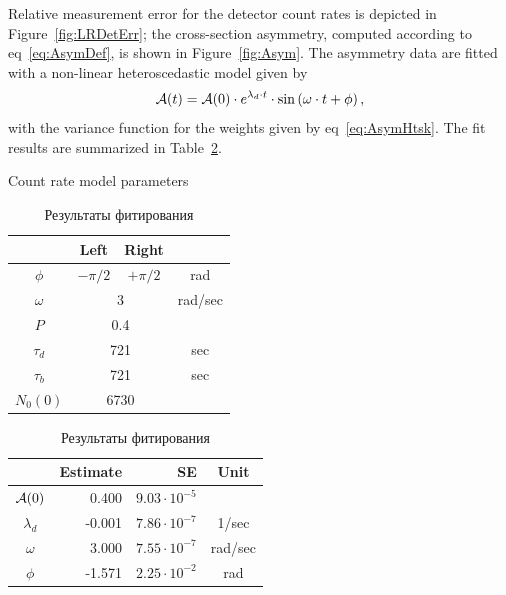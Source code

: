 \documentclass{article}
\newcommand{\vp}[2]{{#1}\cdot 10^{#2}}
\newcommand{\LTb}{\tau_b}
\newcommand{\LTd}{\tau_d}
\newcommand{\lamd}{\lambda_d}
\begin{document}
Relative measurement error for the detector count rates is depicted in Figure~\ref{fig:LRDetErr}; the cross-section asymmetry, computed according to eq~\eqref{eq:AsymDef}, is shown in Figure~\ref{fig:Asym}.
The asymmetry data are fitted with a non-linear heteroscedastic model given by
\[
\Asym(t) = \Asym(0)\cdot e^{\lamd\cdot t}\cdot\sin\bkt{\omega\cdot t + \phi},
\]
with the variance function for the weights given by eq~\eqref{eq:AsymHtsk}. The fit results are summarized in Table~\ref{tbl:FitRes}.
\begin{table}[h]
  \begin{minipage}[t]{.5\linewidth}
    \centering
    \caption{Count rate model parameters\label{tbl:DetCntRtParam}}
    \begin{tabular}[t]{cccc}
      \hline
      &   Left   &     Right     &  \\ \hline
      $\phi$  & $-\pi/2$ &   $+\pi/2$    &   rad   \\
      $\omega$ &  \multicolumn{2}{c}{3}   & rad/sec \\
      $P$    & \multicolumn{2}{c}{0.4}  &  \\
      $\LTd$  & \multicolumn{2}{c}{721}  &   sec   \\
      $\LTb$  & \multicolumn{2}{c}{721}  &   sec   \\
      $N_0(0)$ & \multicolumn{2}{c}{6730} &  \\ \hline
    \end{tabular}
  \end{minipage}%
  \begin{minipage}[t]{.5\linewidth}
    \centering
    \caption{Результаты фитирования\label{tbl:FitRes}}
    \begin{tabular}[t]{crrc}
      \hline
      & Estimate &             SE &  Unit   \\ \hline
      $\mathcal{A}(0)$ &   0.400 & $\vp{9.03}{-5}$ &         \\
      $\lamd$   &  -0.001 & $\vp{7.86}{-7}$ &  1/sec  \\
      $\omega$  &   3.000 & $\vp{7.55}{-7}$ & rad/sec \\
      $\phi$   &  -1.571 & $\vp{2.25}{-2}$ &   rad   \\ \hline
    \end{tabular}
  \end{minipage}
\end{table}
\end{document}
